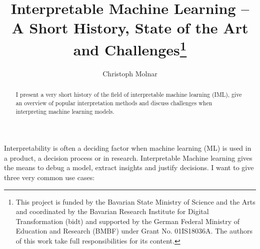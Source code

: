 \documentclass[runningheads]{llncs}
\begin{document}
%
\title{Interpretable Machine Learning -- A Short History, State of the Art and Challenges\thanks{This project is funded by the Bavarian State Ministry of Science and the Arts and coordinated by the Bavarian Research Institute for Digital Transformation (bidt) and supported by the German Federal Ministry of Education and Research (BMBF) under Grant No. 01IS18036A.
The authors of this work take full responsibilities for its content.
}}
%
%
\author{Christoph Molnar}
%
%
%
\maketitle              %
%
\begin{abstract}
  I present a very short history of the field of interpretable machine learning (IML), give an overview of popular interpretation methods and discuss challenges when interpreting machine learning models.

\end{abstract}
%
%
%
Interpretability is often a deciding factor when machine learning (ML) is used in a product, a decision process or in research.
Interpretable Machine learning gives the means to debug a model, extract insights and justify decisions.
I want to give three very common use cases:

\end{document}
